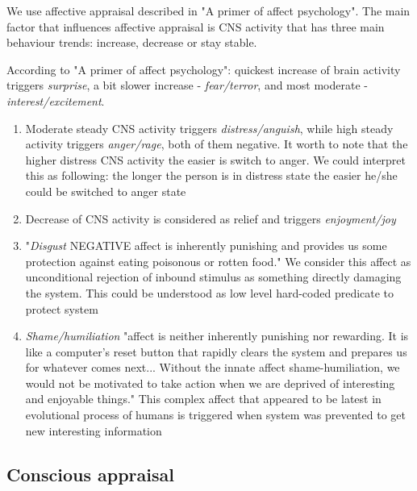 We use affective appraisal described in "A primer of affect psychology"\cite{primer_affect_psychology}. The main factor that influences affective appraisal is CNS activity that has three main behaviour trends: increase, decrease or stay stable.

According to "A primer of affect psychology"\cite{primer_affect_psychology}: quickest increase of brain activity triggers \emph{surprise}, a bit slower increase - \emph{fear/terror}, and most moderate - \emph{interest/excitement}.

\begin{enumerate}
 \item  Moderate steady CNS activity triggers \emph{distress/anguish}, while high steady activity triggers \emph{anger/rage}, both of them negative. It worth to note that the higher distress CNS activity the easier is switch to anger. We could interpret this as following: the longer the person is in distress state the easier he/she could be switched to anger state
 \item  Decrease of CNS activity is considered as relief and triggers \emph{enjoyment/joy}
 \item  "\emph{Disgust} NEGATIVE affect is inherently punishing and provides us some protection against eating poisonous or rotten food." We consider this affect as unconditional rejection of inbound stimulus as something directly damaging the system. This could be understood as low level hard-coded predicate to protect system
 \item  \emph{Shame/humiliation} "affect is neither inherently punishing nor rewarding. It is like a computer’s reset button that rapidly clears the system and prepares us for whatever comes next... Without the innate affect shame-humiliation, we would not be motivated to take action when we are deprived of interesting and enjoyable things." This complex affect that appeared to be latest in evolutional process of humans is triggered when system was prevented to get new interesting information
\end{enumerate}

\subsection{Conscious appraisal}


